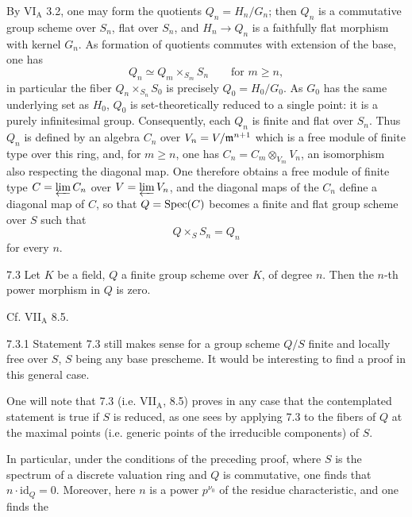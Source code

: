 By VI$_{\mathrm A}$ 3.2, one may form the quotients $Q_n=H_n/G_n$; then $Q_n$ is a commutative group scheme over $S_n$, flat over $S_n$, and $H_n\to Q_n$ is a faithfully flat morphism with kernel $G_n$. As formation of quotients commutes with extension of the base, one has
\[
Q_n\simeq Q_m\times_{S_m}S_n\qquad\text{for }m\geq n,
\]
in particular the fiber $Q_n\times_{S_n}S_0$ is precisely $Q_0=H_0/G_0$. As $G_0$ has the same underlying set as $H_0$, $Q_0$ is set-theoretically reduced to a single point: it is a purely infinitesimal group. Consequently, each $Q_n$ is finite and flat over $S_n$. Thus $Q_n$ is defined by an algebra $C_n$ over $V_n=V/\mathfrak m^{n+1}$ which is a free module of finite type over this ring, and, for $m\geq n$, one has $C_n=C_m\otimes_{V_m}V_n$, an isomorphism also respecting the diagonal map. One therefore obtains a free module of finite type $C=\varprojlim C_n$ over $V=\varprojlim V_n$, and the diagonal maps of the $C_n$ define a diagonal map of $C$, so that $Q=\operatorname{Spec}(C)$ becomes a finite and flat group scheme over $S$ such that
\[
Q\times_S S_n=Q_n
\]
for every $n$.
\begin{lemma}{7.3}\label{VIII.7.3}
 Let $K$ be a field, $Q$ a finite group scheme over $K$, of degree $n$. Then the $n$-th power morphism in $Q$ is zero.
\end{lemma}
Cf. VII$_{\mathrm A}$ 8.5.
\begin{remark}{7.3.1}\label{VIII.7.3.1}
Statement 7.3 still makes sense for a group scheme $Q/S$ finite and locally free over $S$, $S$ being any base prescheme. It would be interesting to find a proof in this general case.

One will note that 7.3 (i.e. VII$_{\mathrm A}$, 8.5) proves in any case that the contemplated statement is true if $S$ is reduced, as one sees by applying 7.3 to the fibers of $Q$ at the maximal points (i.e. generic points of the irreducible components) of $S$.

In particular, under the conditions of the preceding proof, where $S$ is the spectrum of a discrete valuation ring and $Q$ is commutative, one finds that $n\cdot\mathrm{id}_Q=0$. Moreover, here $n$ is a power $p^{\nu_0}$ of the residue characteristic, and one finds the
\end{remark}
